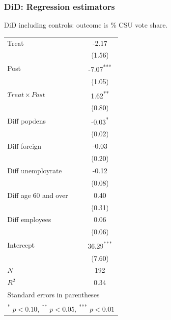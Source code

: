 \documentclass[12pt,english,dvipsnames,aspectratio=169,handout]{beamer}\usepackage[]{graphicx}\usepackage[]{xcolor}
\begin{document}
\begin{frame}
  \frametitle{DiD: Regression estimators}
\footnotesize
DiD including controls: outcome is \% CSU vote share.

\tiny
\centering
\begin{tabular}{l*{1}{c}}
\toprule
Treat &    -2.17         \\
          &   (1.56)         \\
Post      &    -7.07\textsuperscript{***}\\
          &   (1.05)         \\
$Treat\times Post$ &     1.62\textsuperscript{**} \\
          &   (0.80)         \\
Diff popdens&    -0.03\textsuperscript{*}  \\
          &   (0.02)         \\
Diff foreign&    -0.03         \\
          &   (0.20)         \\
Diff unemployrate &    -0.12         \\
          &   (0.08)         \\
Diff age 60 and over &     0.40         \\
          &   (0.31)         \\
Diff employees&     0.06         \\
          &   (0.06)         \\
Intercept   &    36.29\textsuperscript{***}\\
          &   (7.60)         \\
\midrule
\(N\)     &      192         \\
\(R^{2}\) &     0.34         \\
\bottomrule
\multicolumn{2}{l}{Standard errors in parentheses}\\
\multicolumn{2}{l}{ \textsuperscript{*} \(p<0.10\), \textsuperscript{**} \(p<0.05\), \textsuperscript{***} \(p<0.01\)}\\
\end{tabular}
\end{frame}
\end{document}
